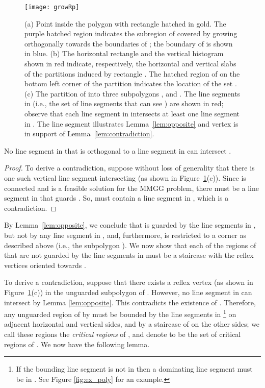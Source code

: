 \documentclass{llncs}
\begin{document}
\begin{figure}[t]
\centering \texttt{[image: growRp]}
\caption{(a) Point  inside the polygon  with rectangle  hatched in gold. The purple hatched region
indicates the subregion of  covered by growing  orthogonally towards the boundaries of ; the boundary
of  is shown in blue.
(b) The horizontal rectangle and the vertical histogram shown in red indicate, respectively, the horizontal and vertical slabs of the partitions induced
by rectangle . The hatched region of  on the bottom left corner of the partition indicates the location of the set . (c) The partition of  into three subpolygons ,  and . The line segments in 
(i.e., the set of line segments that can see ) are shown in red; observe that each line segment in  intersects at least one line
segment in . The line segment  illustrates Lemma~\ref{lem:opposite} and vertex  is in support of Lemma~\ref{lem:contradiction}.}
\label{fig:growingRp}\end{figure}

\begin{lemma}
\label{lem:opposite}
No line segment in  that is orthogonal to a line segment in  can intersect .
\end{lemma}
\begin{proof}
To derive a contradiction, suppose without loss of generality that there is one such vertical line segment  intersecting  
(as shown in Figure~\ref{fig:growingRp}(c)).
Since  is connected and is a feasible solution for the MMGG problem, there must be a line segment in  that
guards . So,  must contain a line segment in , which is a contradiction.
\end{proof}

By Lemma~\ref{lem:opposite}, we conclude that  is guarded by the line
segments in ,
but not by any line segment in , and, furthermore,  is restricted to a corner as described above (i.e., the subpolygon ). We now show that each of the regions of  that are not guarded by
the line segments in  must be a staircase with the reflex vertices oriented towards .

To derive a contradiction, suppose that there exists a reflex vertex  (as shown in Figure~\ref{fig:growingRp}(c)) in the unguarded subpolygon  of . However, no 
line segment in  can intersect  by Lemma \ref{lem:opposite}. This
contradicts the existence of . Therefore, any unguarded region of  by  must be bounded by the line segments 
in \footnote{If the bounding line segment is not in  then a dominating line segment must be in . 
See Figure \ref{fig:ex_poly} for an example.} on adjacent horizontal and
vertical sides, and by a staircase of  on the other sides; we call these regions the \emph{critical regions} of , and denote  to be the set of critical regions
of . We now have the following lemma.
\end{document}
